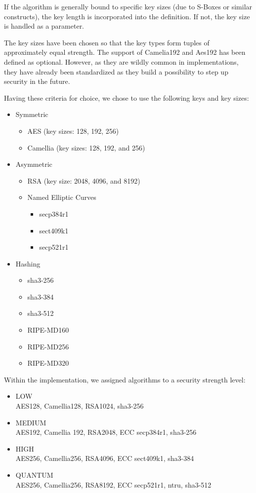 If the algorithm is generally bound to specific key sizes (due to S-Boxes or similar constructs), the key length is incorporated into the definition. If not, the key size is handled as a parameter.

The key sizes have been chosen so that the key types form tuples of approximately equal strength. The support of Camelia192 and Aes192 has been defined as optional. However, as they are wildly common in implementations, they have already been standardized as they build a possibility to step up security in the future.

Having these criteria for choice, we chose to use the following keys and key sizes:
\begin{itemize}
	\item Symmetric
	\begin{itemize}
		\item AES (key sizes: 128, 192, 256)
		\item Camellia (key sizes: 128, 192, and 256)
	\end{itemize}
	\item Asymmetric
	\begin{itemize}
		\item RSA (key size: 2048, 4096, and 8192)
		\item Named Elliptic Curves
		\begin{itemize}
			\item secp384r1
			\item sect409k1
			\item secp521r1
		\end{itemize}
	\end{itemize}
	\item Hashing
	\begin{itemize}
		\item sha3-256
		\item sha3-384
		\item sha3-512
		\item RIPE-MD160
		\item RIPE-MD256
		\item RIPE-MD320
	\end{itemize}
\end{itemize}

Within the implementation, we assigned algorithms to a security strength level:
\begin{itemize}
	\item LOW\\
	AES128, Camellia128, RSA1024, sha3-256
	\item MEDIUM\\
	AES192, Camellia 192, RSA2048, ECC secp384r1, sha3-256
	\item HIGH\\
	AES256, Camellia256, RSA4096, ECC sect409k1, sha3-384
	\item QUANTUM\\
	AES256, Camellia256, RSA8192, ECC secp521r1, ntru, sha3-512
\end{itemize}

